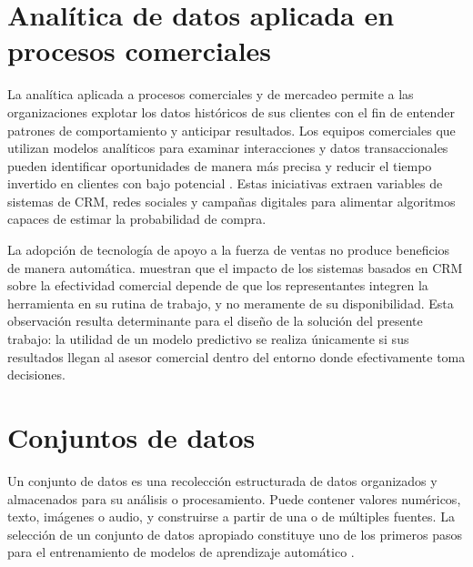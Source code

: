 %

\section{Analítica de datos aplicada en procesos comerciales}

La analítica aplicada a procesos comerciales y de mercadeo permite a las
organizaciones explotar los datos históricos de sus clientes con el fin de
entender patrones de comportamiento y anticipar resultados. Los equipos
comerciales que utilizan modelos analíticos para examinar interacciones y datos
transaccionales pueden identificar oportunidades de manera más precisa y reducir
el tiempo invertido en clientes con bajo potencial
\cite{smith2020howdata, bykowsky2025leaders}. Estas iniciativas extraen variables
de sistemas de CRM, redes sociales y campañas digitales para alimentar algoritmos
capaces de estimar la probabilidad de compra.

La adopción de tecnología de apoyo a la fuerza de ventas no produce beneficios de
manera automática.  muestran que el impacto de los sistemas
basados en CRM sobre la efectividad comercial depende de que los representantes
integren la herramienta en su rutina de trabajo, y no meramente de su
disponibilidad. Esta observación resulta determinante para el diseño de la
solución del presente trabajo: la utilidad de un modelo predictivo se realiza
únicamente si sus resultados llegan al asesor comercial dentro del entorno donde
efectivamente toma decisiones.

\section{Conjuntos de datos}

Un conjunto de datos es una recolección estructurada de datos organizados y
almacenados para su análisis o procesamiento. Puede contener valores numéricos,
texto, imágenes o audio, y construirse a partir de una o de múltiples fuentes. La
selección de un conjunto de datos apropiado constituye uno de los primeros pasos
para el entrenamiento de modelos de aprendizaje automático
\cite{han2011data}.


